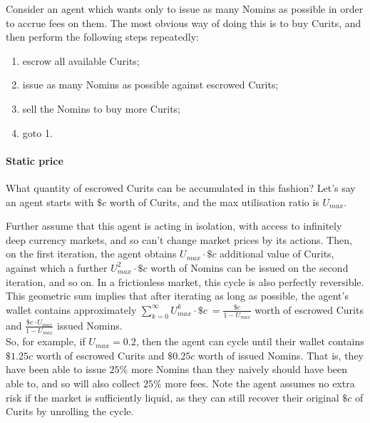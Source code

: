 \noindent Consider an agent which wants only to issue as many Nomins as possible in order to accrue fees on them. The most obvious way of doing this is to buy Curits, and then perform the following steps repeatedly:

\begin{enumerate}
    \item escrow all available Curits;
    \item issue as many Nomins as possible against escrowed Curits;
    \item sell the Nomins to buy more Curits;
    \item goto 1.
\end{enumerate}

\paragraph{Static price}

What quantity of escrowed Curits can be accumulated in this fashion?
Let's say an agent starts with \(\$c\) worth of Curits, and the max utilisation ratio is \(U_{max}\).

\noindent Further assume that this agent is acting in isolation, with access to infinitely deep currency markets, and so can't change market prices by its actions. Then, on the first iteration, the agent obtains \(U_{max} \cdot \$c\) additional value of Curits, against which a further \(U_{max}^2 \cdot \$c\) worth of Nomins can be issued on the second iteration, and so on. In a frictionless market, this cycle is also perfectly reversible. \\

\noindent  This geometric sum implies that after iterating as long as possible, the agent's wallet contains approximately \(\sum_{k=0}^{\infty} {U_{max}^k \cdot \$c}\ = \frac{\$c}{1  - U_{max}}\) worth of escrowed Curits and \(\frac{\$c \cdot U_{max}}{1  - U_{max}}\) issued Nomins.\\

\noindent So, for example, if \(U_{max} = 0.2\), then the agent can cycle until their wallet contains \(\$1.25c\) worth of escrowed Curits and \(\$0.25c\) worth of issued Nomins. That is, they have been able to issue \(25\%\) more Nomins than they naively should have been able to, and so will also collect \(25\%\) more fees. Note the agent assumes no extra risk if the market is sufficiently liquid, as they can still recover their original \(\$c\) of Curits by unrolling the cycle. \\


